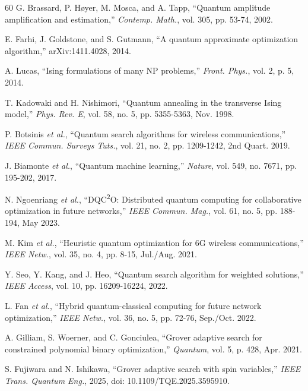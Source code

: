 \documentclass[journal]{IEEEtran}
\begin{document}
\begin{thebibliography}{60}
G. Brassard, P. H\o yer, M. Mosca, and A. Tapp, ``Quantum amplitude
amplification and estimation,'' \emph{Contemp. Math.}, vol. 305,
pp. 53-74, 2002.

E. Farhi, J. Goldstone, and S. Gutmann, ``A quantum approximate
optimization algorithm,'' arXiv:1411.4028, 2014.

A. Lucas, ``Ising formulations of many NP problems,''
\emph{Front. Phys.}, vol. 2, p. 5, 2014.

T. Kadowaki and H. Nishimori, ``Quantum annealing in the transverse
Ising model,'' \emph{Phys. Rev. E}, vol. 58, no. 5, pp. 5355-5363,
Nov. 1998.

P. Botsinis \emph{et al.}, ``Quantum search algorithms for wireless
communications,'' \emph{IEEE Commun. Surveys Tuts.}, vol. 21, no. 2,
pp. 1209-1242, 2nd Quart. 2019.

J. Biamonte \emph{et al.}, ``Quantum machine learning,''
\emph{Nature}, vol. 549, no. 7671, pp. 195-202, 2017.

N. Ngoenriang \emph{et al.}, ``DQC\textsuperscript{2}O: Distributed
quantum computing for collaborative optimization in future
networks,'' \emph{IEEE Commun. Mag.}, vol. 61, no. 5, pp. 188-194,
May 2023.

M. Kim \emph{et al.}, ``Heuristic quantum optimization for 6G
wireless communications,'' \emph{IEEE Netw.}, vol. 35, no. 4,
pp. 8-15, Jul./Aug. 2021.

Y. Seo, Y. Kang, and J. Heo, ``Quantum search algorithm for
weighted solutions,'' \emph{IEEE Access}, vol. 10,
pp. 16209-16224, 2022.

L. Fan \emph{et al.}, ``Hybrid quantum-classical computing for
future network optimization,'' \emph{IEEE Netw.}, vol. 36, no. 5,
pp. 72-76, Sep./Oct. 2022.

A. Gilliam, S. Woerner, and C. Gonciulea, ``Grover adaptive search
for constrained polynomial binary optimization,'' \emph{Quantum},
vol. 5, p. 428, Apr. 2021.

S. Fujiwara and N. Ishikawa, ``Grover adaptive search with spin
variables,'' \emph{IEEE Trans. Quantum Eng.}, 2025,
doi: 10.1109/TQE.2025.3595910.


\end{thebibliography}
\end{document}

